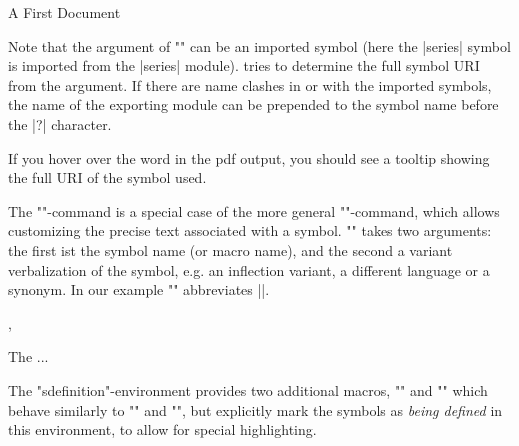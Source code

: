 \begin{sfragment}{A First \sTeX Document}
\begin{function}{\symname}
      Note that the argument of \stexcode"\symref" can be 
      an imported symbol
      (here the |series| symbol is imported from the |series| module). \sTeX tries to
      determine the full symbol URI from the argument. If there are name clashes in or
      with the imported symbols, the name of the exporting module can be prepended to the
      symbol name before the |?| character.

      If you hover over the word
      in the pdf output, you should see a tooltip showing the full URI
      of the symbol used.
    \end{function}
    \begin{function}{\symref}
      The \stexcode"\symname"-command is a special case of the more general
      \stexcode"\symref"-command, which allows customizing the precise text associated
      with a symbol. \stexcode"\symref" takes two arguments: the first ist the symbol
      name (or macro name), and the second a variant verbalization of the symbol, e.g. an inflection
      variant, a different language or a synonym. In our example
      \stexcode"" abbreviates \stexcode||.
      
    \end{function}
    \begin{function}{,}
      \begin{latexcode}[numbers=none,aboveskip=0pt,belowskip=0pt,gobble=6]
        The  ...
      \end{latexcode}
      The \stexcode"sdefinition"-environment provides two additional
      macros, \stexcode"" and \stexcode"" which behave
      similarly to \stexcode"\symname" and \stexcode"\symref", but explicitly mark
      the symbols as \emph{being defined} in this environment,
      to allow for special highlighting.
    \end{function}\bigskip


\end{sfragment}
